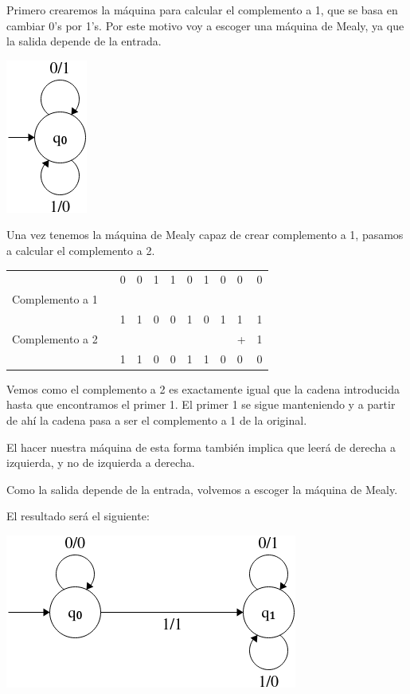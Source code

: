 \documentclass[12pt, spanish]{article}
\begin{document}
Primero crearemos la máquina para calcular el complemento a 1, que se basa en cambiar 0's por 1's. Por este motivo voy a escoger una máquina de Mealy, ya que la salida depende de la entrada.


\begin{center}
	\includegraphics[scale=0.7]{maquina_1.png}
\end{center}

Una vez tenemos la máquina de Mealy capaz de crear complemento a 1, pasamos a calcular el complemento a 2.

\begin{table}[h]
\begin{tabular}{lllllllllll}
                &  & 0 & 0 & 1 & 1 & 0 & 1 & 0 & 0 & 0  \\
Complemento a 1 &  &   &   &   &   &   &   &   &   &    \\ \hline
                &  & 1 & 1 & 0 & 0 & 1 & 0 & 1 & 1 & 1  \\
Complemento a 2 &  &   &   &   &   &   &   &   & +  & 1 \\ \hline
                &  & 1 & 1 & 0 & 0 & 1 & 1 & 0 & 0 & 0 
\end{tabular}
\end{table}


Vemos como el complemento a 2 es exactamente igual que la cadena introducida hasta que encontramos el primer 1. El primer 1 se sigue manteniendo y a partir de ahí la cadena pasa a ser el complemento a 1 de la original.

El hacer nuestra máquina de esta forma también implica que leerá de derecha a izquierda, y no de izquierda a derecha.

Como la salida depende de la entrada, volvemos a escoger la máquina de Mealy.

\newpage

El resultado será el siguiente:

\begin{center}
	\includegraphics[scale=0.7]{maquina_2.png}
\end{center}
\end{document}
